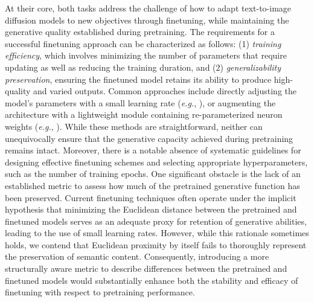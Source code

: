 At their core, both tasks address the challenge of how to adapt text-to-image diffusion models to new objectives through finetuning, while maintaining the generative quality established during pretraining. The requirements for a successful finetuning approach can be characterized as follows: (1) \emph{training efficiency}, which involves minimizing the number of parameters that require updating as well as reducing the training duration, and (2) \emph{generalizability preservation}, ensuring the finetuned model retains its ability to produce high-quality and varied outputs. Common approaches include directly adjusting the model's parameters with a small learning rate (\emph{e.g.}, \cite{ruiz2023dreambooth}), or augmenting the architecture with a lightweight module containing re-parameterized neuron weights (\emph{e.g.}, \cite{hulora2022,zhang2023adding}). While these methods are straightforward, neither can unequivocally ensure that the generative capacity achieved during pretraining remains intact. Moreover, there is a notable absence of systematic guidelines for designing effective finetuning schemes and selecting appropriate hyperparameters, such as the number of training epochs. One significant obstacle is the lack of an established metric to assess how much of the pretrained generative function has been preserved. Current finetuning techniques often operate under the implicit hypothesis that minimizing the Euclidean distance between the pretrained and finetuned models serves as an adequate proxy for retention of generative abilities, leading to the use of small learning rates. However, while this rationale sometimes holds, we contend that Euclidean proximity by itself fails to thoroughly represent the preservation of semantic content. Consequently, introducing a more structurally aware metric to describe differences between the pretrained and finetuned models would substantially enhance both the stability and efficacy of finetuning with respect to pretraining performance.

